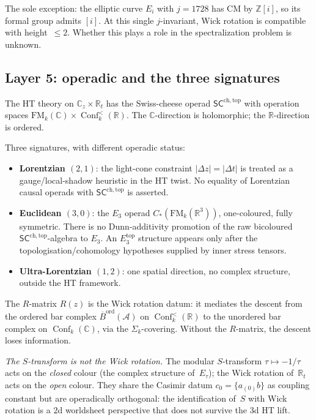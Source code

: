 \documentclass[11pt]{article}
\newcommand{\cA}{\mathcal{A}}
\newcommand{\barB}{\overline{B}}
\newcommand{\C}{\mathbb{C}}
\newcommand{\Z}{\mathbb{Z}}
\newcommand{\R}{\mathbb{R}}
\newcommand{\SCchtop}{\mathsf{SC}^{\mathrm{ch,top}}}
\newcommand{\FM}{\mathrm{FM}}
\DeclareMathOperator{\Conf}{Conf}
\begin{document}
The sole exception: the elliptic curve $E_{i}$ with $j = 1728$
has $\mathrm{CM}$ by $\Z[i]$, so its formal group admits $[i]$.
At this single $j$-invariant, Wick rotation is compatible with
height~$\le 2$.  Whether this plays a role in the spectralization
problem is unknown.

\subsection{Layer 5: operadic and the three signatures}

The HT theory on $\C_z \times \R_t$ has the Swiss-cheese operad
$\SCchtop$ with operation spaces
$\FM_k(\C) \times \Conf_k^{<}(\R)$.  The $\C$-direction is
holomorphic; the $\R$-direction is ordered.

Three signatures, with different operadic status:
\begin{itemize}
\item \textbf{Lorentzian $(2,1)$}: the light-cone constraint
  $|{\Delta z}| = |{\Delta t}|$ is treated as a gauge/local-shadow
  heuristic in the HT twist.  No equality of Lorentzian causal
  operads with $\SCchtop$ is asserted.
\item \textbf{Euclidean $(3,0)$}: the $E_3$ operad
  $C_*(\FM_k(\R^3))$, one-coloured, fully symmetric.  There is no
  Dunn-additivity promotion of the raw bicoloured
  $\SCchtop$-algebra to $E_3$.  An $E_3^{\mathrm{top}}$ structure
  appears only after the topologisation/cohomology hypotheses
  supplied by inner stress tensors.
\item \textbf{Ultra-Lorentzian $(1,2)$}: one spatial direction,
  no complex structure, outside the HT framework.
\end{itemize}

The $R$-matrix $R(z)$ is the Wick rotation datum: it mediates
the descent from the ordered bar complex
$\barB^{\mathrm{ord}}(\cA)$ on $\Conf_k^{<}(\R)$ to the
unordered bar complex on $\Conf_k(\C)$, via the
$\Sigma_k$-covering.  Without the $R$-matrix, the descent
loses information.

\emph{The $S$-transform is not the Wick rotation.}  The modular
$S$-transform $\tau \mapsto -1/\tau$ acts on the \emph{closed}
colour (the complex structure of~$E_\tau$); the Wick rotation
of~$\R_t$ acts on the \emph{open} colour.  They share the
Casimir datum $c_0 = \{a_{(0)}b\}$ as coupling constant but
are operadically orthogonal: the identification of~$S$ with
Wick rotation is a $2$d worldsheet perspective that does not
survive the $3$d HT lift.
\end{document}
